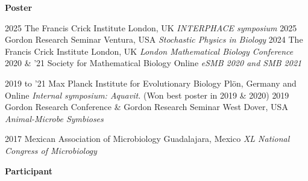 \documentclass[]{friggeri-cv} %
\begin{document}
\textbf{Poster}

\begin{entrylist}
\entry
{2025}
{}
{The Francis Crick Institute}
{London, UK}
{{\normalsize\emph{INTERPHACE symposium}}}
{\vspace{-3mm}}
\entry
{2025}
{}
{Gordon Research Seminar}
{Ventura, USA}
{{\normalsize\emph{Stochastic Physics in Biology}}}
{\vspace{-3mm}}
\entry
{2024}
{}
{The Francis Crick Institute}
{London, UK}
{{\normalsize\emph{London Mathematical Biology Conference}}}
{\vspace{-3mm}}
\entry
{2020 \& '21}
{}%
{Society for Mathematical Biology}
{Online}
{{\normalsize\emph{eSMB 2020 and SMB 2021}}}
{\vspace{-3mm}}
\end{entrylist}
\begin{entrylist}
\entry
{2019 to '21}
{}%
{Max Planck Institute for Evolutionary Biology}
{Plön, Germany and Online}
{{\normalsize\emph{Internal symposium: Aquavit.} (Won best poster in 2019 \& 2020)}}
{\vspace{-3mm}}
\entry
{2019}
{}%
{Gordon Research Conference \& Gordon Research Seminar}
{West Dover, USA}
{{\normalsize\emph{Animal-Microbe Symbioses}}}
{\vspace{-3mm}}
\end{entrylist}
\begin{entrylist}
\entry
{2017}
{}%
{Mexican Association of Microbiology}
{Guadalajara, Mexico}
{{\normalsize\emph{XL National Congress of Microbiology}}}
{\vspace{-3mm}}
\end{entrylist}

\textbf{Participant}
\end{document}
